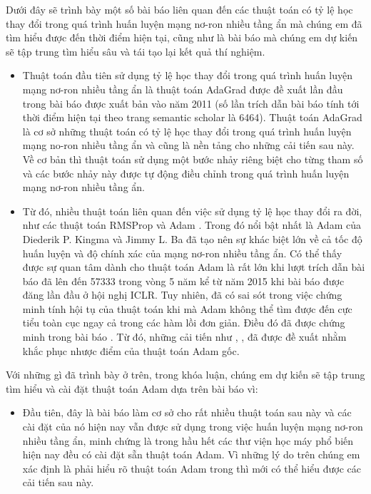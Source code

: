 \documentclass{article}[14pt]
\begin{document}
{    %
    Dưới đây sẽ trình bày một số bài báo liên quan đến các thuật toán có tỷ lệ học thay đổi trong quá trình huấn luyện mạng nơ-ron nhiều tầng ẩn mà chúng em đã tìm hiểu được đến thời điểm hiện tại, cũng như là bài báo mà chúng em dự kiến sẽ tập trung tìm hiểu sâu và tái tạo lại kết quả thí nghiệm.
    \begin{itemize}
        \item Thuật toán đầu tiên sử dụng tỷ lệ học thay đổi trong quá trình huấn luyện mạng nơ-ron nhiều tầng ẩn là thuật toán AdaGrad được đề xuất lần đầu trong bài báo \cite{Duchi2011AdaptiveSM} được xuất bản vào năm 2011 (số lần trích dẫn bài báo tính tới thời điểm hiện tại theo trang semantic scholar là 6464). Thuật toán AdaGrad là cơ sở những thuật toán có tỷ lệ học thay đổi trong quá trình huấn luyện mạng no-ron nhiều tầng ẩn và cũng là nền tảng cho những cải tiến sau này. Về cơ bản thì thuật toán sử dụng một bước nhảy riêng biệt cho từng tham số và các bước nhảy này được tự động điều chỉnh trong quá trình huấn luyện mạng nơ-ron nhiều tầng ẩn.
        \item Từ đó, nhiều thuật toán liên quan đến việc sử dụng tỷ lệ học thay đổi ra đời, như các thuật toán RMSProp \cite{Tieleman2012RMSProp} và Adam \cite{Kingma2015AdamAM}. Trong đó nổi bật nhất là Adam của Diederik P. Kingma và Jimmy L. Ba đã tạo nên sự khác biệt lớn về cả tốc độ huấn luyện và độ chính xác của mạng nơ-ron nhiều tầng ẩn. Có thể thấy được sự quan tâm dành cho thuật toán Adam là rất lớn khi lượt trích dẫn bài báo đã lên đến 57333 trong vòng 5 năm kể từ năm 2015 khi bài báo được đăng lần đầu ở hội nghị ICLR. Tuy nhiên, đã có sai sót trong việc chứng minh tính hội tụ của thuật toán khi mà Adam không thể tìm được đến cực tiểu toàn cục ngay cả trong các hàm lồi đơn giản. Điều đó đã được chứng minh trong bài báo \cite{Reddi2018OnTC}. Từ đó, những cải tiến như \cite{Reddi2018OnTC}, \cite{Dozat2016IncorporatingNM}, \cite{Zhang2017NormalizedDA} đã được đề xuất nhằm khắc phục nhược điểm của thuật toán Adam gốc.
    \end{itemize}
    Với những gì đã trình bày ở trên, trong khóa luận, chúng em dự kiến sẽ tập trung tìm hiểu và cài đặt thuật toán Adam dựa trên bài báo \cite{Kingma2015AdamAM} vì:
    \begin{itemize}
        \item Đầu tiên, đây là bài báo làm cơ sở cho rất nhiều thuật toán sau này và các cài đặt của nó hiện nay vẫn được sử dụng trong việc huấn luyện mạng nơ-ron nhiều tầng ẩn, minh chứng là trong hầu hết các thư viện học máy phổ biến hiện nay đều có cài đặt sẵn thuật toán Adam. Vì những lý do trên chúng em xác định là phải hiểu rõ thuật toán Adam trong \cite{Kingma2015AdamAM} thì mới có thể hiểu được các cải tiến sau này.

\end{itemize}}
\end{document}

